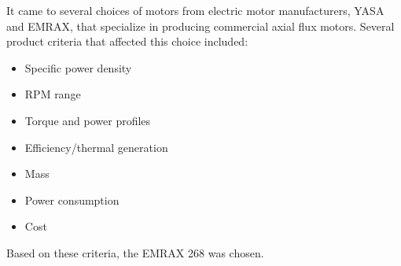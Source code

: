 \documentclass[main.tex]{subfiles}
\begin{document}
    It came to several choices of motors from electric motor manufacturers, YASA and EMRAX, that specialize in producing commercial axial flux motors. Several product criteria that affected this choice included:
    \begin{itemize}
        \item Specific power density
        \item RPM range
        \item Torque and power profiles
        \item Efficiency/thermal generation
        \item Mass
        \item Power consumption
        \item Cost
    \end{itemize}

    Based on these criteria, the EMRAX 268 was chosen.\\
\end{document}
